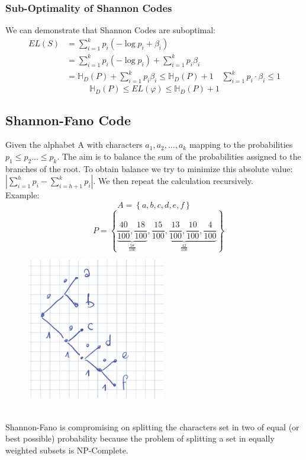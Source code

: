    \subsubsection*{Sub-Optimality of Shannon Codes}
    We can demonstrate that Shannon Codes are suboptimal:
    \begin{align*}
        EL(S) &= \sum_{i=1}^{k}{p_i (-\log{p_i}+\beta_i)}\\
        &=\sum_{i=1}^{k}{p_i (-\log{p_i})} + \sum_{i=1}^{k}{p_i \beta_i}\\
        &=\mathbb{H}_D(P) + \sum_{i=1}^{k}{p_i\beta_i}\leq \mathbb{H}_D(P)+1 \quad \sum_{i=1}^{k}{p_i\cdot\beta_i} \leq1
    \end{align*}
    $$\mathbb{H}_D(P) \leq EL(\varphi) \leq \mathbb{H}_D(P)+1$$
    



    \subsection*{Shannon-Fano Code}
    Given the alphabet A with characters $a_1, a_2, \ldots, a_k $ mapping to the probabilities $ p_1\leq p_2\ldots \leq p_k$. The aim is to balance the sum of the probabilities assigned to the branches of the root. To obtain balance we try to minimize this absolute value: $|\sum_{i=1}^{h}{p_i}- \sum_{i=h+1}^{k}{p_i}|$. We then repeat the calculation recursively.\\
    Example: 
    $$A= \left\{ a,b,c,d,e,f \right\}$$
    $$\quad P=\left\{ \underbrace{\frac{40}{100}, \frac{18}{100}}_{\frac{58}{100}}, \underbrace{\frac{15}{100}, \frac{13}{100}, \frac{10}{100}, \frac{4}{100}}_{\frac{42}{100}} \right\}$$
    \begin{figure}[htbp]
        \centering
        \includegraphics[width = 6cm]{Information Theory/Data Compression/ShannonFano-Tree.png}
    \end{figure}\\
    Shannon-Fano is compromising on splitting the characters set in two of equal (or best possible) probability because the problem of splitting a set in equally weighted subsets is NP-Complete.\newline



